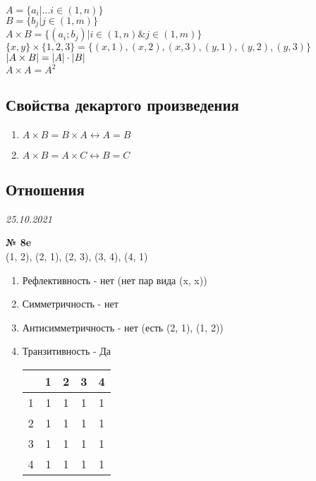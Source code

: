 \documentclass[12pt]{article}
\DeclarePairedDelimiter\abs{\lvert}{\rvert}%
\newenvironment{task}[1][0]{\vspace{.5cm} {\textbf{№ #1} \vspace{.5cm}\\ }}{}
\begin{document}
$A = \{a_i | ...i \in (1, n)\}$\\
$B = \{b_j| j \in (1, m)\}$\\
$A \times B = \{(a_i; b_j)|i \in (1,n) \& j \in (1, m)\}$\\
$\{x, y\} \times \{1, 2, 3\} = \{(x, 1), (x, 2), (x, 3), (y, 1), (y, 2), (y, 3)\}$\\
$\abs{A \times B} = \abs{A} \cdot \abs{B}$\\
$A \times A = A^2$\\
\subsection{Свойства декартого произведения}
\begin{enumerate}
	\item $A \times B = B \times A \leftrightarrow A = B$
	\item $A \times B = A \times C \leftrightarrow B=C$
\end{enumerate}

\newpage
\subsection{Отношения}
{\hfill \textit{25.10.2021}\\}

\begin{task}[8e]
{(1, 2), (2, 1), (2, 3), (3, 4), (4, 1)}\\
\begin{enumerate}
	\item Рефлективность - нет (нет пар вида (x, x))
	\item Симметричность - нет
	\item Антисимметричность - нет (есть (2, 1), (1, 2))
	\item{Транзитивность - Да\\
\begin{tabular}{c|c|c|c|c}
	& 1 & 2 & 3 & 4\\
	\hline
	1 & 1 & 1 & 1 & 1\\
	\hline
	2 & 1 & 1 & 1 & 1\\
	\hline
	3 & 1 & 1 & 1 & 1\\
	\hline
	4 & 1 & 1 & 1 & 1\\
\end{tabular}	
}
\end{enumerate}
\end{task}
\end{document}
